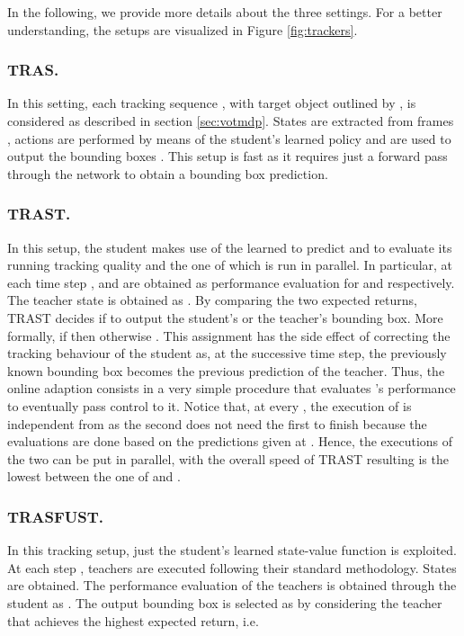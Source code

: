 \documentclass[runningheads]{llncs}
\makeatletter
\def\myalgonamefirst{TRAS\@\xspace}
\def\myalgonamesecond{TRAST\@\xspace}
\def\myalgonamethird{TRASFUST\@\xspace}
\makeatother
\begin{document}
In the following, we provide more details about the three settings. For a better understanding, the setups are visualized in Figure \ref{fig:trackers}.

\subsubsection{\myalgonamefirst.} In this setting, each tracking sequence , with target object outlined by , is considered as  described in section \ref{sec:votmdp}. States  are extracted from frames , actions are performed by means of the student's learned policy  and are used to output the bounding boxes . 
This setup is fast as it requires just a forward pass through the network to obtain a bounding box prediction.

\subsubsection{\myalgonamesecond.} 
In this setup, the student makes use of the learned  to predict  and  to evaluate its running tracking quality and the one of  which is run in parallel. 
In particular, at each time step ,  and  are obtained as performance evaluation for  and  respectively. The teacher state is obtained as . By comparing the two expected returns, \myalgonamesecond decides if to output the student's or the teacher's bounding box. More formally, if  then  otherwise . This assignment has the side effect of correcting the tracking behaviour of the student as, at the successive time step, the previously known bounding box becomes the previous prediction of the teacher. 
Thus, the online adaption consists in a very simple procedure that evaluates 's performance to eventually pass control to it. Notice that, at every , the execution of  is independent from  as the second does not need the first to finish because the evaluations are done based on the predictions given at . Hence, the executions of the two can be put in parallel, with the overall speed of \myalgonamesecond resulting is the lowest between the one of  and . 

\subsubsection{\myalgonamethird.} 
\label{sec:trasfust}
In this tracking setup, just the student's learned state-value function  is exploited. At each step , teachers  are executed following their standard methodology. States  are obtained. The performance evaluation of the teachers is obtained through the student as . The output bounding box is selected as  by considering the teacher  that achieves the highest expected return, i.e. 
 
\end{document}
